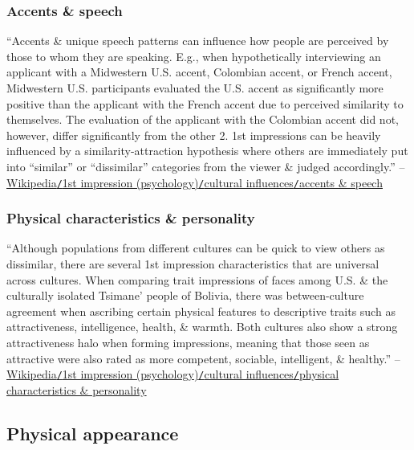 \documentclass[oneside]{book}
\numberwithin{equation}{section}
\begin{document}
\subsubsection{Accents \& speech}
``Accents \& unique speech patterns can influence how people are perceived by those to whom they are speaking. E.g., when hypothetically interviewing an applicant with a Midwestern U.S. accent, Colombian accent, or French accent, Midwestern U.S. participants evaluated the U.S. accent as significantly more positive than the applicant with the French accent due to perceived similarity to themselves. The evaluation of the applicant with the Colombian accent did not, however, differ significantly from the other 2. 1st impressions can be heavily influenced by a similarity-attraction hypothesis where others are immediately put into ``similar'' or ``dissimilar'' categories from the viewer \& judged accordingly.'' -- \href{https://en.wikipedia.org/wiki/First_impression_(psychology)#Accents_and_speech}{Wikipedia\texttt{/}1st impression (psychology)\texttt{/}cultural influences\texttt{/}accents \& speech}

\subsubsection{Physical characteristics \& personality}
``Although populations from different cultures can be quick to view others as dissimilar, there are several 1st impression characteristics that are universal across cultures. When comparing trait impressions of faces among U.S. \& the culturally isolated Tsimane' people of Bolivia, there was between-culture agreement when ascribing certain physical features to descriptive traits such as attractiveness, intelligence, health, \& warmth. Both cultures also show a strong attractiveness halo when forming impressions, meaning that those seen as attractive were also rated as more competent, sociable, intelligent, \& healthy.'' -- \href{https://en.wikipedia.org/wiki/First_impression_(psychology)#Physical_characteristics_and_personality}{Wikipedia\texttt{/}1st impression (psychology)\texttt{/}cultural influences\texttt{/}physical characteristics \& personality}

\subsection{Physical appearance}
\end{document}
